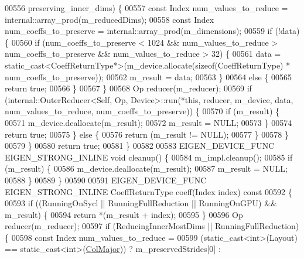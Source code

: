 \begin{DoxyCode}
00556           preserving\_inner\_dims) \{
00557         \textcolor{keyword}{const} Index num\_values\_to\_reduce = internal::array\_prod(m\_reducedDims);
00558         \textcolor{keyword}{const} Index num\_coeffs\_to\_preserve = internal::array\_prod(m\_dimensions);
00559         \textcolor{keywordflow}{if} (!data) \{
00560           \textcolor{keywordflow}{if} (num\_coeffs\_to\_preserve < 1024 && num\_values\_to\_reduce > num\_coeffs\_to\_preserve && 
      num\_values\_to\_reduce > 32) \{
00561             data = \textcolor{keyword}{static\_cast<}CoeffReturnType*\textcolor{keyword}{>}(m\_device.allocate(\textcolor{keyword}{sizeof}(CoeffReturnType) * 
      num\_coeffs\_to\_preserve));
00562             m\_result = data;
00563           \}
00564           \textcolor{keywordflow}{else} \{
00565             \textcolor{keywordflow}{return} \textcolor{keyword}{true};
00566           \}
00567         \}
00568         Op reducer(m\_reducer);
00569         \textcolor{keywordflow}{if} (internal::OuterReducer<Self, Op, Device>::run(*\textcolor{keyword}{this}, reducer, m\_device, data, 
      num\_values\_to\_reduce, num\_coeffs\_to\_preserve)) \{
00570           \textcolor{keywordflow}{if} (m\_result) \{
00571             m\_device.deallocate(m\_result);
00572             m\_result = NULL;
00573           \}
00574           \textcolor{keywordflow}{return} \textcolor{keyword}{true};
00575         \} \textcolor{keywordflow}{else} \{
00576           \textcolor{keywordflow}{return} (m\_result != NULL);
00577         \}
00578       \}
00579     \}
00580     \textcolor{keywordflow}{return} \textcolor{keyword}{true};
00581   \}
00582 
00583   EIGEN\_DEVICE\_FUNC EIGEN\_STRONG\_INLINE \textcolor{keywordtype}{void} cleanup() \{
00584     m\_impl.cleanup();
00585     \textcolor{keywordflow}{if} (m\_result) \{
00586       m\_device.deallocate(m\_result);
00587       m\_result = NULL;
00588     \}
00589   \}
00590 
00591   EIGEN\_DEVICE\_FUNC EIGEN\_STRONG\_INLINE CoeffReturnType coeff(Index index)\textcolor{keyword}{ const}
00592 \textcolor{keyword}{  }\{
00593     \textcolor{keywordflow}{if} ((RunningOnSycl || RunningFullReduction || RunningOnGPU) && m\_result) \{
00594       \textcolor{keywordflow}{return} *(m\_result + index);
00595     \}
00596     Op reducer(m\_reducer);
00597     \textcolor{keywordflow}{if} (ReducingInnerMostDims || RunningFullReduction) \{
00598       \textcolor{keyword}{const} Index num\_values\_to\_reduce =
00599         (\textcolor{keyword}{static\_cast<}\textcolor{keywordtype}{int}\textcolor{keyword}{>}(Layout) == static\_cast<int>(\hyperlink{group__enums_ggaacded1a18ae58b0f554751f6cdf9eb13a0cbd4bdd0abcfc0224c5fcb5e4f6669a}{ColMajor})) ? m\_preservedStrides[0] : 

\end{DoxyCode}
